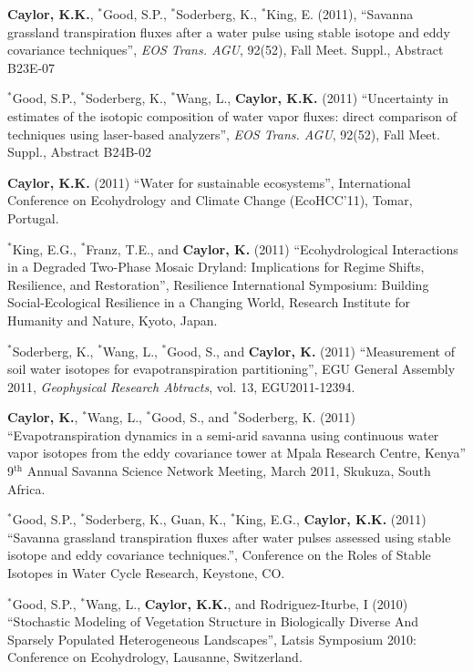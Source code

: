 \documentclass[10pt]{article}
\begin{document}
\begin{etaremune}
\item \textbf{Caylor, K.K.},  $^{*}$Good, S.P.,  $^{*}$Soderberg, K.,  $^{*}$King, E. (2011), ``Savanna grassland transpiration fluxes after a water pulse using stable isotope and eddy covariance techniques'', \emph{EOS Trans. AGU}, 92(52), Fall Meet. Suppl., Abstract B23E-07

\item  $^{*}$Good, S.P., $^{*}$Soderberg, K., $^{*}$Wang, L., \textbf{Caylor, K.K.} (2011) ``Uncertainty in estimates of the isotopic composition of water vapor fluxes: direct comparison of techniques using laser-based analyzers'', \emph{EOS Trans. AGU}, 92(52), Fall Meet. Suppl., Abstract B24B-02 

\item \textbf{Caylor, K.K.} (2011) ``Water for sustainable ecosystems'', International Conference on Ecohydrology and Climate Change (EcoHCC'11), Tomar, Portugal.

\item $^{*}$King, E.G., $^{*}$Franz, T.E., and \textbf{Caylor, K.} (2011) ``Ecohydrological Interactions in a Degraded Two-Phase Mosaic Dryland: Implications for Regime Shifts, Resilience, and Restoration'', Resilience International Symposium: Building Social-Ecological Resilience in a Changing World, Research Institute for Humanity and Nature, Kyoto, Japan.

\item $^{*}$Soderberg, K., $^{*}$Wang, L., $^{*}$Good, S., and \textbf{Caylor, K.} (2011) ``Measurement of soil water isotopes for evapotranspiration partitioning'',  EGU General Assembly 2011, \emph{Geophysical Research Abtracts}, vol. 13, EGU2011-12394.

\item \textbf{Caylor, K.}, $^{*}$Wang, L., $^{*}$Good, S., and $^{*}$Soderberg, K. (2011) ``Evapotranspiration dynamics in a semi-arid savanna using continuous water vapor isotopes from the eddy covariance tower at Mpala Research Centre, Kenya''  9$^{\mbox{th}}$ Annual Savanna Science Network Meeting, March 2011, Skukuza, South Africa.

\item $^{*}$Good, S.P., $^{*}$Soderberg, K., Guan, K., $^{*}$King, E.G., \textbf{Caylor, K.K.} (2011) ``Savanna grassland transpiration fluxes after water pulses assessed using stable isotope and eddy covariance techniques.'', Conference on the Roles of Stable Isotopes in Water Cycle Research, Keystone, CO.

\item $^{*}$Good, S.P., $^{*}$Wang, L.,  \textbf{Caylor, K.K.}, and Rodriguez-Iturbe, I (2010) ``Stochastic Modeling of Vegetation Structure in Biologically Diverse And Sparsely Populated Heterogeneous Landscapes'', Latsis Symposium 2010: Conference on Ecohydrology, Lausanne, Switzerland.


\end{etaremune}
\end{document}
